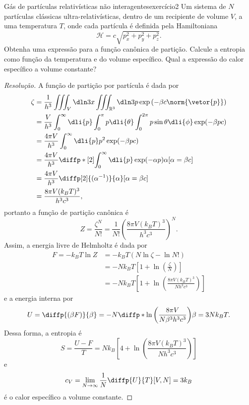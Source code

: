 \begin{exercício}{Gás de partículas relativísticas não interagentes}{exercício2}
    Um sistema de \(N\) partículas clássicas ultra-relativísticas, dentro de um recipiente de volume \(V\), a uma temperatura \(T\), onde cada partícula é definida pela Hamiltoniana
    \begin{equation*}
        \mathcal{H} = c\sqrt{p_x^2 + p_y^2 + p_z^2}.
    \end{equation*}
    Obtenha uma expressão para a função canônica de partição. Calcule a entropia como função da temperatura e do volume específico. Qual a expressão do calor específico a volume constante?
\end{exercício}
\begin{proof}[Resolução]
    A função de partição por partícula é dada por
    \begin{align*}
        \zeta &= \frac{1}{h^3}\iiint_{V} \dln3x \iiint_{\mathbb{R}^3} \dln3p \exp\left(-\beta c \norm{\vetor{p}}\right)\\
              &= \frac{V}{h^3} \int_0^\infty \dli{p} \int_0^{\pi} p \dli{\theta} \int_0^{2\pi} p\sin\theta \dli{\phi} \exp(- \beta pc)\\
              &= \frac{4\pi V}{h^3} \int_0^\infty \dli{p} p^2\exp(- \beta pc)\\
              &= \frac{4\pi V}{h^3} \diffp*[2]{\int_0^\infty \dli{p} \exp(-\alpha p)}{\alpha}[\alpha = \beta c]\\
              &= \frac{4\pi V}{h^3} \diffp[2]{(\alpha^{-1})}{\alpha}[\alpha = \beta c]\\
              &= \frac{8 \pi V(k_B T)^3}{h^3 c^3},
    \end{align*}
    portanto a função de partição canônica é
    \begin{equation*}
        Z = \frac{\zeta^N}{N!} = \frac{1}{N!}\left(\frac{8\pi V(k_B T)^3}{h^3c^3}\right)^N.
    \end{equation*}
    Assim, a energia livre de Helmholtz é dada por
    \begin{align*}
        F = - k_BT \ln Z &= -k_BT\left(N \ln{\zeta} - \ln{N!}\right)\\
                         &= -N k_BT\left[1 + \ln\left(\frac{\zeta}{N}\right)\right]\\
                         &= -N k_B T\left[1 + \ln\left(\frac{8\pi V (k_B T)^3}{N h^3c^3}\right)\right]
    \end{align*}
    e a energia interna por
    \begin{equation*}
        U = \diffp{(\beta F)}{\beta} = -N \diffp*{\ln\left(\frac{8\pi V}{N \beta^3 h^3 c^3}\right)}{\beta} = 3N k_B T.
    \end{equation*}
    Dessa forma, a entropia é
    \begin{equation*}
        S = \frac{U - F}{T} = N k_B\left[4 + \ln\left(\frac{8\pi V (k_BT)^3}{N h^3 c^3}\right)\right]
    \end{equation*}
    e
    \begin{equation*}
        c_V = \lim_{N \to \infty} \frac{1}{N}\diffp{U}{T}[V,N] = 3k_B
    \end{equation*}
    é o calor específico a volume constante.
\end{proof}
